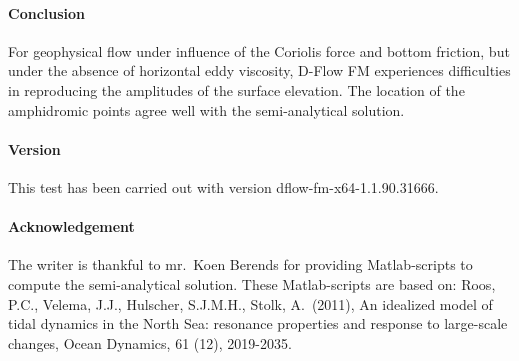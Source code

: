 \paragraph*{Conclusion}
For geophysical flow under influence of the Coriolis force and bottom friction, but under the absence of horizontal eddy viscosity, D-Flow FM experiences difficulties in reproducing the amplitudes of the surface elevation. The location of the amphidromic points agree well with the semi-analytical solution.



\paragraph*{Version}
This test has been carried out with version dflow-fm-x64-1.1.90.31666.


\paragraph*{Acknowledgement}
The writer is thankful to mr.\ Koen Berends for providing Matlab-scripts to compute the semi-analytical solution. These Matlab-scripts are based on: Roos, P.C., Velema, J.J., Hulscher, S.J.M.H., Stolk, A.\ (2011), An idealized model of tidal dynamics in the North Sea: resonance properties and response to large-scale changes, Ocean Dynamics, 61 (12), 2019-2035.


